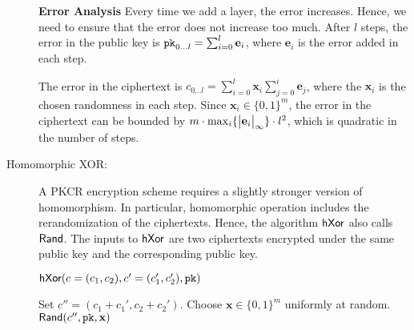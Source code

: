 \begin{description}
	\textbf{Error Analysis}
	Every time we add a layer, the error increases. Hence, we need to ensure that the error does not increase too much. After $l$ steps, the error in the public key is $\texttt{pk}_{0\dots l} = \sum_{i = 0}^{l} \mathbf{e}_i$, where $\mathbf{e}_i$ is the error added in each step.
	
	The error in the ciphertext is $c_{0\dots l} = \sum_{i = 0}^{l} \mathbf{x}_{i} \sum_{j=0}^{i} \mathbf{e}_j$, where the $\mathbf{x}_{i}$ is the chosen randomness in each step. Since $\mathbf{x}_i \in \{0,1\}^{m}$, the error in the ciphertext can be bounded by $m \cdot \max_{i}\{\big\lvert\mathbf{e}_i\big\rvert_{\infty}\} \cdot l^2$, which is quadratic in the number of steps.
	
	\item[Homomorphic XOR:] A PKCR encryption scheme requires a slightly stronger version of homomorphism. In particular, homomorphic operation includes the rerandomization of the ciphertexts. Hence, the algorithm $\textsf{hXor}$ also calls $\textsf{Rand}$. The inputs to $\textsf{hXor}$ are two ciphertexts encrypted under the same public key and the corresponding public key.
	
	\begin{algobox}{$\textsf{hXor}(c = (c_1,c_2),c' = (c_1',c_2'),\texttt{pk})$}
		\begin{algorithmic}
			\State Set $c'' = (c_1 + c_1', c_2 + c_2')$.
			\State Choose $\mathbf{x} \in \{0,1\}^{m}$ uniformly at random.
			\State \Return $\textsf{Rand}(c'',\texttt{pk},\mathbf{x})$
		\end{algorithmic}
	\end{algobox}
\end{description}